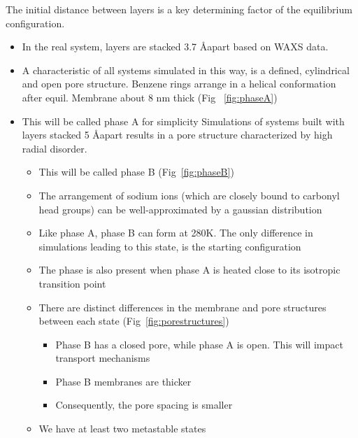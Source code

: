 \documentclass{article}
\newcommand{\angstrom}{\textup{\AA}}
\begin{document}
        The initial distance between layers is a key determining factor of the equilibrium configuration.
	\begin{itemize}
                \item In the real system, layers are stacked 3.7 \angstrom apart based on WAXS data. 
                \item A characteristic of all systems simulated in this way, is a defined, cylindrical and open pore structure. Benzene rings arrange in a helical conformation after equil. Membrane about 8 nm thick (Fig ~\ref{fig:phaseA}) %
                \item This will be called phase A for simplicity  
	        Simulations of systems built with layers stacked 5 \angstrom apart results in a pore structure characterized by high radial disorder.
        	\begin{itemize}
                	\item This will be called phase B (Fig~\ref{fig:phaseB})
                	\item The arrangement of sodium ions (which are closely bound to carbonyl head groups) can be well-approximated by a gaussian distribution 
                	\item Like phase A, phase B can form at 280K. The only difference in simulations leading to this state, is the starting configuration
                	\item The phase is also present when phase A is heated close to its isotropic transition point
                	\item There are distinct differences in the membrane and pore structures between each state (Fig~\ref{fig:porestructures})
                	\begin{itemize}
                        	\item Phase B has a closed pore, while phase A is open. This will impact transport mechanisms
                        	\item Phase B membranes are thicker
                        	\item Consequently, the pore spacing is smaller
                	\end{itemize}
                \item We have at least two metastable states
        \end{itemize}


\end{itemize}
\end{document}
